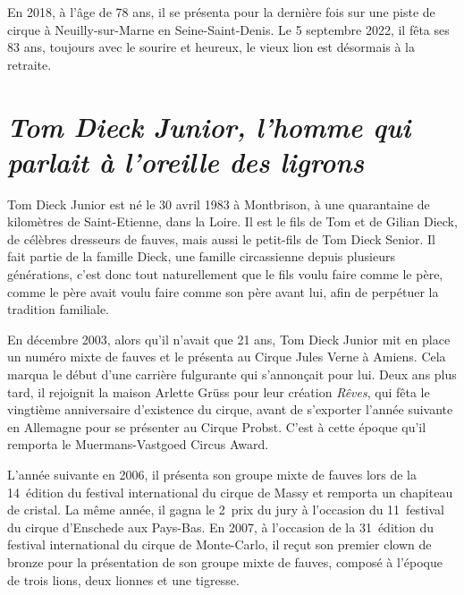 En 2018, à l'âge de 78 ans, il se présenta pour la dernière fois sur une piste de cirque à Neuilly-sur-Marne en Seine-Saint-Denis. Le 5 septembre 2022, il fêta ses 83 ans, toujours avec le sourire et heureux, le vieux lion est désormais à la retraite.

\section*{\textit{Tom Dieck Junior, l'homme qui parlait à l'oreille des ligrons}}
{}
\noindent
Tom Dieck Junior est né le 30 avril 1983 à Montbrison, à une quarantaine de kilomètres de Saint-Etienne, dans la Loire. Il est le fils de Tom et de Gilian Dieck, de célèbres dresseurs de fauves, mais aussi le petit-fils de Tom Dieck Senior. Il fait partie de la famille Dieck, une famille circassienne depuis plusieurs générations, c'est donc tout naturellement que le fils voulu faire comme le père, comme le père avait voulu faire comme son père avant lui, afin de perpétuer la tradition familiale.

En décembre 2003, alors qu'il n'avait que 21 ans, Tom Dieck Junior mit en place un numéro mixte de fauves et le présenta au Cirque Jules Verne à Amiens. Cela marqua le début d'une carrière fulgurante qui s'annonçait pour lui. Deux ans plus tard, il rejoignit la maison Arlette Grüss pour leur création \textit{Rêves}, qui fêta le vingtième anniversaire d'existence du cirque, avant de s'exporter l'année suivante en Allemagne pour se présenter au Cirque Probst. C'est à cette époque qu'il remporta le Muermans-Vastgoed Circus Award.

L'année suivante en 2006, il présenta son groupe mixte de fauves lors de la 14\ieme~édition du festival international du cirque de Massy et remporta un chapiteau de cristal. La même année, il gagna le 2\ieme~prix du jury à l'occasion du 11\ieme~festival du cirque d'Enschede aux Pays-Bas. En 2007, à l'occasion de la 31\ieme~édition du festival international du cirque de Monte-Carlo, il reçut son premier clown de bronze pour la présentation de son groupe mixte de fauves, composé à l'époque de trois lions, deux lionnes et une tigresse.

